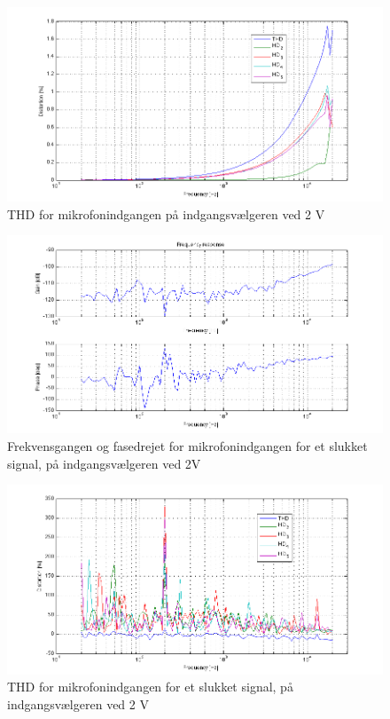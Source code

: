 \begin{figure}[h]
\centering
\includegraphics[width=\textwidth]{maalerapporter/indgangsvaelger/Indgangsvlger-mic-2v-thd.png}
\caption{THD for mikrofonindgangen på indgangsvælgeren ved 2 V}
\label{fig:apind:thd2v}
\end{figure}


\begin{figure}[h]
\centering
\includegraphics[width=\textwidth]{maalerapporter/indgangsvaelger/Indgangsvlger-mic-2v-slukket-frek.png}
\caption{Frekvensgangen og fasedrejet for mikrofonindgangen for et slukket signal, på indgangsvælgeren ved 2V}
\label{fig:apind:frek2vslukket}
\end{figure}


\begin{figure}[h]
\centering
\includegraphics[width=\textwidth]{maalerapporter/indgangsvaelger/Indgangsvlger-mic-2v-slukket-thd.png}
\caption{THD for mikrofonindgangen for et slukket signal, på indgangsvælgeren ved 2 V}
\label{fig:apind:thd2vslukket}
\end{figure}

